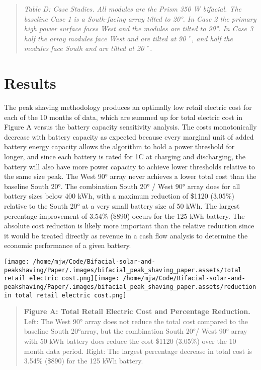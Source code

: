 \documentclass[
]{article}
\begin{document}
\begin{quote}
\emph{Table D: Case Studies. All modules are the Prism 350 W bifacial.
The baseline Case 1 is a South-facing array tilted to 20°. In Case 2 the
primary high power surface faces West and the modules are tilted to 90°.
In Case 3 half the array modules face West and are tilted at 90˚, and
half the modules face South and are tilted at 20˚.}
\end{quote}

\hypertarget{results}{%
\section{Results}\label{results}}

The peak shaving methodology produces an optimally low retail electric
cost for each of the 10 months of data, which are summed up for total
electric cost in Figure A versus the battery capacity sensitivity
analysis. The costs monotonically decrease with battery capacity as
expected because every marginal unit of added battery energy capacity
allows the algorithm to hold a power threshold for longer, and since
each battery is rated for 1C at charging and discharging, the battery
will also have more power capacity to achieve lower thresholds relative
to the same size peak. The West 90° array never achieves a lower total
cost than the baseline South 20°. The combination South 20° / West 90°
array does for all battery sizes below 400 kWh, with a maximum reduction
of \$1120 (3.05\%) relative to the South 20° at a very small battery
size of 50 kWh. The largest percentage improvement of 3.54\% (\$890)
occurs for the 125 kWh battery. The absolute cost reduction is likely
more important than the relative reduction since it would be treated
directly as revenue in a cash flow analysis to determine the economic
performance of a given battery.

\texttt{[image: /home/mjw/Code/Bifacial-solar-and-peakshaving/Paper/.images/bifacial\_peak\_shaving\_paper.assets/total retail electric cost.png]}\texttt{[image: /home/mjw/Code/Bifacial-solar-and-peakshaving/Paper/.images/bifacial\_peak\_shaving\_paper.assets/reduction in total retail electric cost.png]}

\begin{quote}
\textbf{Figure A: Total Retail Electric Cost and Percentage Reduction.}
Left: The West 90° array does not reduce the total cost compared to the
baseline South 20°array, but the combination South 20°/ West 90° array
with 50 kWh battery does reduce the cost \$1120 (3.05\%) over the 10
month data period. Right: The largest percentage decrease in total cost
is 3.54\% (\$890) for the 125 kWh battery.
\end{quote}
\end{document}

